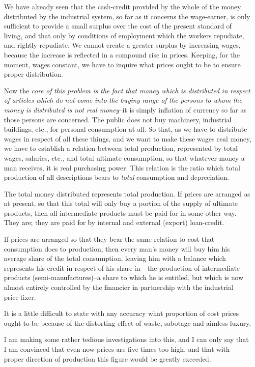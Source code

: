 \documentclass{book}
\begin{document}
We have already seen that the cash-credit provided by the whole of the money distributed by the industrial system, so far as it concerns the wage-earner, is only sufficient to provide a small surplus over the cost of the present standard of living, and that only by conditions of employment which the workers repudiate, and rightly repudiate. We cannot create a greater surplus by increasing wages, because the increase is reflected in a compound rise in prices. Keeping, for the moment, wages constant, we have to inquire what prices ought to be to ensure proper distribution.

Now the \emph{core of this problem is the fact that money which is distributed in respect of articles which do not come into the buying range of the persons to whom the money is distributed is not real money}–it is simply inflation of currency so far as those persons are concerned. The public does not buy machinery, industrial buildings, etc., for personal consumption at all. So that, as we have to distribute wages in respect of all these things, and we want to make these wages real money, we have to establish a relation between total production, represented by total wages, salaries, etc., and total ultimate consumption, so that whatever money a man receives, it is real purchasing power. This relation is the ratio which total production of all descriptions bears to \emph{total} consumption and depreciation.

The total money distributed represents total production. If prices are arranged as at present, so that this total will only buy a portion of the supply of ultimate products, then all intermediate products must be paid for in some other way. They are; they are paid for by internal and external (export) loan-credit.

If prices are arranged so that they bear the same relation to cost that consumption does to production, then every man’s money will buy him his average share of the total consumption, leaving him with a balance which represents his credit in respect of his share in—the production of intermediate products (semi-manufactures)–a share to which he is entitled, but which is now almost entirely controlled by the financier in partnership with the industrial price-fixer.

It is a little difficult to state with any accuracy what proportion of cost prices ought to be because of the distorting effect of waste, sabotage and aimless luxury.

I am making some rather tedious investigations into this, and I can only say that I am convinced that even now prices are five times too high, and that with proper direction of production this figure would be greatly exceeded.
\end{document}
